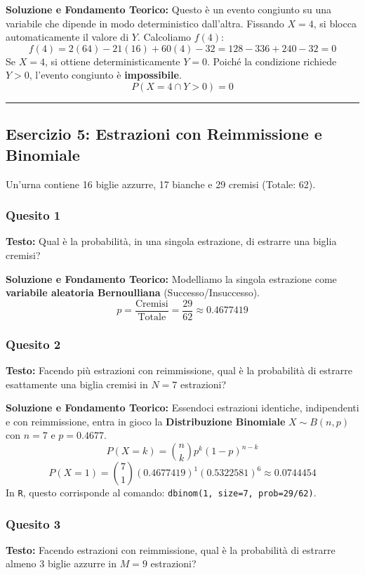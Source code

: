 \documentclass[12pt, a4paper]{article}
\begin{document}
\textbf{Soluzione e Fondamento Teorico:} 
Questo è un evento congiunto su una variabile che dipende in modo deterministico dall'altra. Fissando $X=4$, si blocca automaticamente il valore di $Y$. Calcoliamo $f(4)$:
$$ f(4) = 2(64) - 21(16) + 60(4) - 32 = 128 - 336 + 240 - 32 = 0 $$
Se $X=4$, si ottiene deterministicamente $Y=0$. Poiché la condizione richiede $Y>0$, l'evento congiunto è \textbf{impossibile}.
$$ P(X=4 \cap Y>0) = 0 $$

\vspace{0.5cm}\hrule\vspace{0.5cm}

\subsection*{Esercizio 5: Estrazioni con Reimmissione e Binomiale}
Un'urna contiene 16 biglie azzurre, 17 bianche e 29 cremisi (Totale: 62).

\subsubsection*{Quesito 1}
\textbf{Testo:} Qual è la probabilità, in una singola estrazione, di estrarre una biglia cremisi?

\textbf{Soluzione e Fondamento Teorico:} 
Modelliamo la singola estrazione come \textbf{variabile aleatoria Bernoulliana} (Successo/Insuccesso).
$$ p = \frac{\text{Cremisi}}{\text{Totale}} = \frac{29}{62} \approx 0.4677419 $$

\subsubsection*{Quesito 2}
\textbf{Testo:} Facendo più estrazioni con reimmissione, qual è la probabilità di estrarre esattamente una biglia cremisi in $N=7$ estrazioni?

\textbf{Soluzione e Fondamento Teorico:} 
Essendoci estrazioni identiche, indipendenti e con reimmissione, entra in gioco la \textbf{Distribuzione Binomiale} $X \sim B(n,p)$ con $n=7$ e $p=0.4677$.
$$ P(X=k) = \binom{n}{k} p^k (1-p)^{n-k} $$
$$ P(X=1) = \binom{7}{1} (0.4677419)^1 (0.5322581)^6 \approx 0.0744454 $$
In \texttt{R}, questo corrisponde al comando: \texttt{dbinom(1, size=7, prob=29/62)}.

\subsubsection*{Quesito 3}
\textbf{Testo:} Facendo estrazioni con reimmissione, qual è la probabilità di estrarre almeno 3 biglie azzurre in $M=9$ estrazioni?
\end{document}
